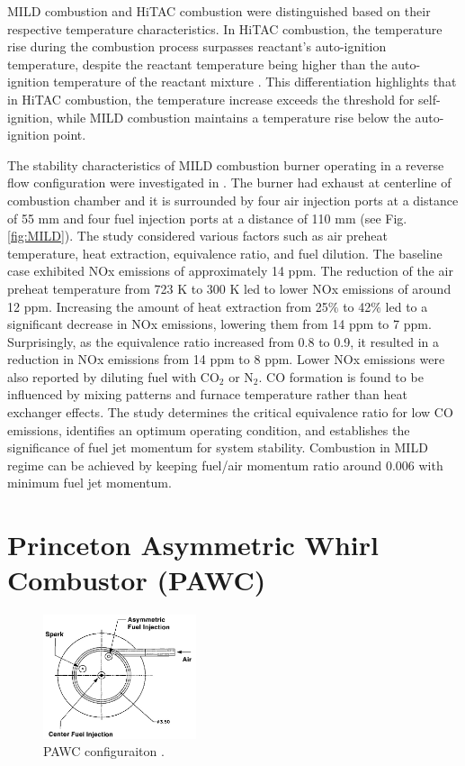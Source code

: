 MILD combustion and HiTAC combustion were distinguished based on their respective temperature characteristics. In HiTAC combustion, the temperature rise during the combustion process surpasses reactant's auto-ignition temperature, despite the reactant temperature being higher than the auto-ignition temperature of the reactant mixture \cite{GUPTA2020116766}. This differentiation highlights that in HiTAC combustion, the temperature increase exceeds the threshold for self-ignition, while MILD combustion maintains a temperature rise below the auto-ignition point.

The stability characteristics of MILD combustion burner operating in a reverse flow configuration were investigated in \cite{SZEGO2009429}. The burner had exhaust at centerline of combustion chamber and it is surrounded by four air injection ports at a distance of 55 mm and four fuel injection ports at a distance of 110 mm (see Fig. \ref{fig:MILD}). The study considered various factors such as air preheat temperature, heat extraction, equivalence ratio, and fuel dilution. The baseline case exhibited NOx emissions of approximately 14 ppm. The reduction of the air preheat temperature from 723 K to 300 K led to lower NOx emissions of around 12 ppm. Increasing the amount of heat extraction from 25$\%$ to 42$\%$ led to a significant decrease in NOx emissions, lowering them from 14 ppm to 7 ppm. Surprisingly, as the equivalence ratio increased from 0.8 to 0.9, it resulted in a reduction in NOx emissions from 14 ppm to 8 ppm. Lower NOx emissions were also reported by diluting fuel with CO$_2$ or N$_2$. CO formation is found to be influenced by mixing patterns and furnace temperature rather than heat exchanger effects. The study determines the critical equivalence ratio for low CO emissions, identifies an optimum operating condition, and establishes the significance of fuel jet momentum for system stability. Combustion in MILD regime can be achieved by keeping fuel/air momentum ratio around 0.006 with minimum fuel jet momentum.

\section{Princeton Asymmetric Whirl Combustor (PAWC)}
\begin{figure}
    \centering
    \includegraphics[width=0.4\textwidth]{Chapter2/Images/PAWC.jpeg}
  \caption[PAWC configuraiton]{PAWC configuraiton \cite{YETTER20001265}.}
  \label{fig:PAWC}
\end{figure}

